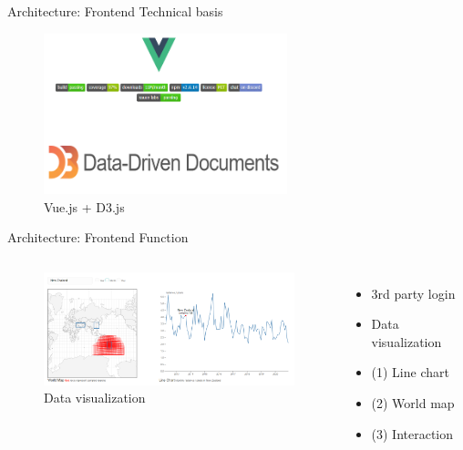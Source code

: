 \documentclass[aspectratio=169]{beamer}
\begin{document}
\begin{frame}[fragile]{Architecture: Frontend Technical basis}

	\begin{figure}[htbp]
		\centerline{\includegraphics[width=200pt]{images/VueAndD3.png}}
        \caption{Vue.js \cite{Introduc89:online} + D3.js \cite{2013Interactive} }
    \end{figure}

\end{frame}

\begin{frame}[fragile]{Architecture: Frontend Function}

  \begin{columns}
      \begin{figure}[htbp]
        \centerline{\includegraphics[width=220pt]{images/Interaction_of_visualization.png}}
        \caption{Data visualization}
       \end{figure}

      \begin{itemize}
        \item 3rd party login
        \pause
        \item Data visualization
		\pause
		\item (1) Line chart
		\pause
		\item (2) World map
		\pause
		\item (3) Interaction
      \end{itemize}
  \end{columns}

\end{frame}
\end{document}
